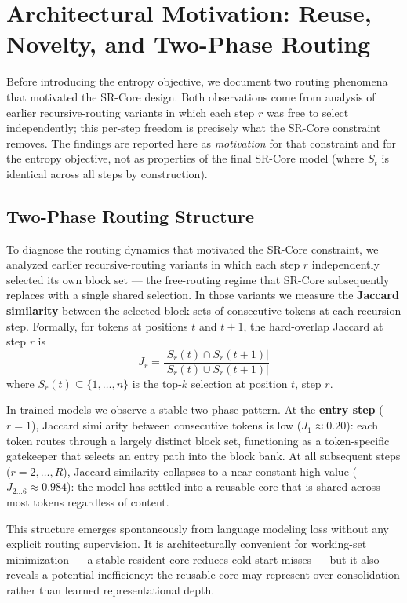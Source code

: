 \section{Architectural Motivation: Reuse, Novelty, and Two-Phase Routing}
\label{sec:motivation}

Before introducing the entropy objective, we document two routing phenomena that motivated
the SR-Core design.
Both observations come from analysis of earlier recursive-routing variants in which each
step $r$ was free to select independently; this per-step freedom is precisely what the
SR-Core constraint removes.
The findings are reported here as \emph{motivation} for that constraint and for the entropy
objective, not as properties of the final SR-Core model (where $S_t$ is identical across
all steps by construction).

\subsection{Two-Phase Routing Structure}
\label{sec:two-phase}

To diagnose the routing dynamics that motivated the SR-Core constraint, we analyzed earlier
recursive-routing variants in which each step $r$ independently selected its own block set
--- the free-routing regime that SR-Core subsequently replaces with a single shared
selection.
In those variants we measure the \textbf{Jaccard similarity} between the selected block
sets of consecutive tokens at each recursion step.
Formally, for tokens at positions $t$ and $t+1$, the hard-overlap Jaccard at step $r$ is
\begin{equation}
  J_r = \frac{|S_r(t) \cap S_r(t+1)|}{|S_r(t) \cup S_r(t+1)|}
  \label{eq:jaccard}
\end{equation}
where $S_r(t) \subseteq \{1, \ldots, n\}$ is the top-$k$ selection at position $t$, step $r$.

In trained models we observe a stable two-phase pattern.
At the \textbf{entry step} ($r = 1$), Jaccard similarity between consecutive tokens is low
($J_1 \approx 0.20$): each token routes through a largely distinct block set, functioning
as a token-specific gatekeeper that selects an entry path into the block bank.
At all subsequent steps ($r = 2, \ldots, R$), Jaccard similarity collapses to a
near-constant high value ($J_{2\ldots6} \approx 0.984$): the model has settled into a
reusable core that is shared across most tokens regardless of content.

This structure emerges spontaneously from language modeling loss without any explicit routing
supervision.
It is architecturally convenient for working-set minimization --- a stable resident core
reduces cold-start misses --- but it also reveals a potential inefficiency: the reusable
core may represent over-consolidation rather than learned representational depth.

